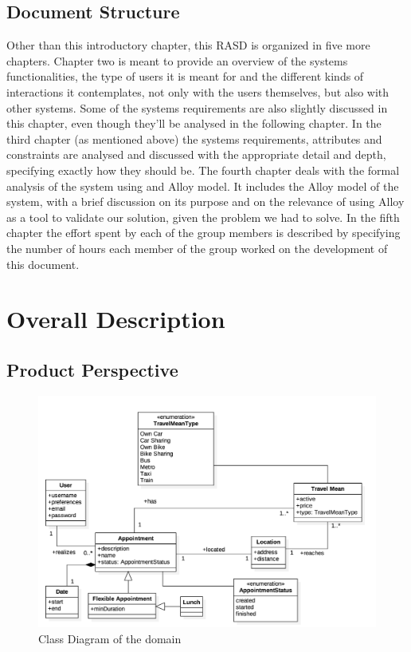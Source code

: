 \documentclass[12pt]{article}
\begin{document}
\subsection{Document Structure}
Other than this introductory chapter, this RASD is organized in five more chapters. Chapter two is meant to provide an overview of the systems functionalities, the type of users it is meant for and the different kinds of interactions it contemplates, not only with the users themselves, but also with other systems. Some of the systems requirements are also slightly discussed in this chapter, even though they’ll be analysed in the following chapter. In the third chapter (as mentioned above) the systems requirements, attributes and constraints are analysed and discussed with the appropriate detail and depth, specifying exactly how they should be.
The fourth chapter deals with the formal analysis of the system using and Alloy model. It includes the Alloy model of the system, with a brief discussion on its purpose and on the relevance of using Alloy as a tool to validate our solution, given the problem we had to solve.
In the fifth chapter the effort spent by each of the group members is described by specifying the number of hours each member of the group worked on the development of this document.

\section{Overall Description}

\subsection{Product Perspective}
    \begin{figure}[ht]
        \includegraphics[scale=0.52]{domainModel.png}
        \caption{Class Diagram of the domain}
    \label{fig:domainModel}
    \end{figure}
\end{document}
